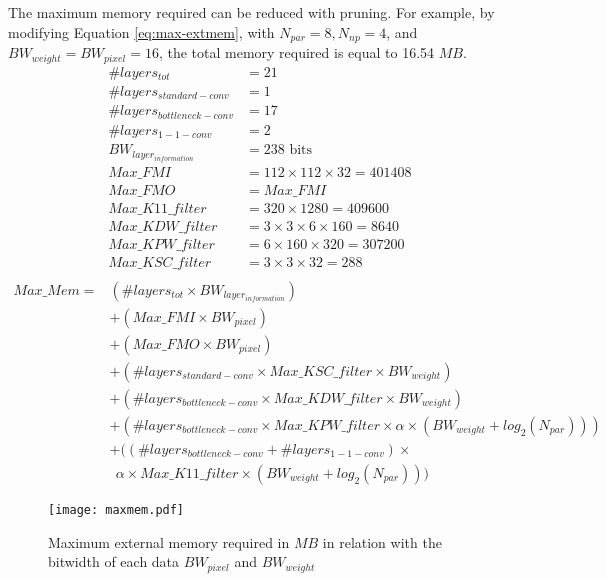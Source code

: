 The maximum memory required can be reduced with pruning. For example, by modifying Equation \eqref{eq:max-extmem}, with $N_{par} = 8, N_{np} = 4$, and $BW_{weight} = BW_{pixel} = 16$, the total memory required is equal to 16.54 $MB$.
%
\begin{align}
    \# layers_{tot} &= 21 \\
    \# layers_{standard-conv} &= 1 \\
    \# layers_{bottleneck-conv} &= 17 \\
    \# layers_{1-1-conv} &= 2 \\
    BW_{layer_{information}} &= 238 \text{ bits} \\
    Max\_FMI &= 112 \times 112 \times 32 = 401408 \\
    Max\_FMO &= Max\_FMI \\
    Max\_K11\_filter &= 320 \times 1280 = 409600 \\
    Max\_KDW\_filter &= 3 \times 3 \times 6 \times 160 = 8640\\
    Max\_KPW\_filter &= 6 \times 160 \times 320 = 307200 \\
    Max\_KSC\_filter &= 3 \times 3 \times 32 = 288 \\
\end{align}
%
\begin{equation}
    \begin{split}
        Max\_Mem = &\left(\# layers_{tot} \times BW_{layer_{information}} \right) \\
        &+ \left( Max\_FMI \times BW_{pixel} \right) \\
        &+ \left( Max\_FMO \times BW_{pixel} \right) \\
        &+ \left( \# layers_{standard-conv} \times Max\_KSC\_filter \times BW_{weight} \right) \\
        &+ \left( \# layers_{bottleneck-conv} \times Max\_KDW\_filter \times BW_{weight} \right)\\
        &+ \left( \# layers_{bottleneck-conv} \times Max\_KPW\_filter \times \alpha \times(BW_{weight} + log_2(N_{par})) \right)\\
        &+ ( \left(\# layers_{bottleneck-conv} + \# layers_{1-1-conv}\right) \times \\
        & \ \ \alpha \times Max\_K11\_filter \times  (BW_{weight} + log_2(N_{par})) )
    \end{split}
\label{eq:max-extmem}
\end{equation}
%
\begin{figure}
    \centering
    \texttt{[image: maxmem.pdf]}
    \caption{Maximum external memory required in $MB$ in relation with the bitwidth of each data $BW_{pixel}$ and $BW_{weight}$}
    \label{fig:max-mem}
\end{figure}
%
